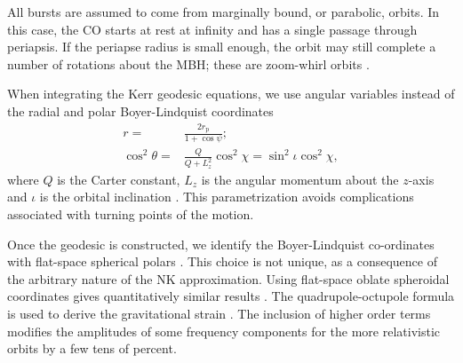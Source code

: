 \documentclass[useAMS,usedcolumn,usegraphicx,usenatbib]{mn2e}
\newcommand{\sub}[1]{\ensuremath{_\mathrm{#1}}}
\begin{document}
All bursts are assumed to come from marginally bound, or parabolic, orbits. In this case, the CO starts at rest at infinity and has a single passage through periapsis. If the periapse radius is small enough, the orbit may still complete a number of rotations about the MBH; these are zoom-whirl orbits \citep{Glampedakis2002a}.

When integrating the Kerr geodesic equations, we use angular variables instead of the radial and polar Boyer-Lindquist coordinates \citep{Drasco2004}
\begin{align}
r = {} & \frac{2 r\sub{p}}{1 + \cos\psi};\\
\cos^2\theta = {} & \frac{Q}{Q+L_z^2}\cos^2\chi = \sin^2 \iota \cos^2\chi,
\end{align}
where $Q$ is the Carter constant, $L_z$ is the angular momentum about the $z$-axis and $\iota$ is the orbital inclination \citep*{Glampedakis2002}. This parametrization avoids complications associated with turning points of the motion.

Once the geodesic is constructed, we identify the Boyer-Lindquist co-ordinates with flat-space spherical polars \citep{Gair2005, Babak2007}. This choice is not unique, as a consequence of the arbitrary nature of the NK approximation. Using flat-space oblate spheroidal coordinates gives quantitatively similar results \citep{Berry2013}. The quadrupole-octupole formula is used to derive the gravitational strain \citep{Bekenstein1973, Press1977, Yunes2008}. The inclusion of higher order terms modifies the amplitudes of some frequency components for the more relativistic orbits by a few tens of percent.
\end{document}

